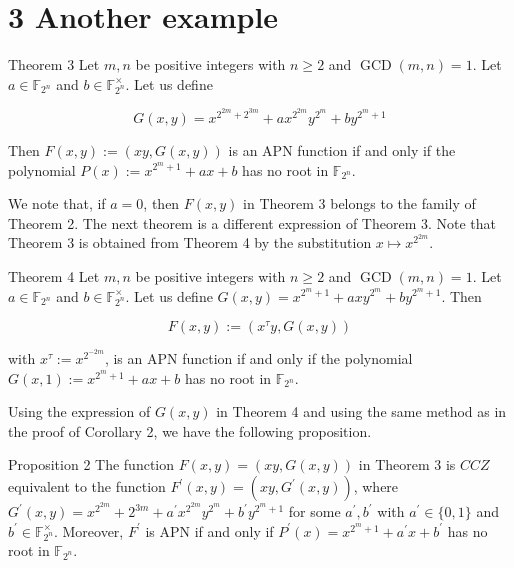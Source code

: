 \documentclass[10pt]{article}
\begin{document}
\section*{3 Another example}
Theorem 3 Let $m, n$ be positive integers with $n \geq 2$ and $\operatorname{GCD}(m, n)=1$. Let $a \in \mathbb{F}_{2^{n}}$ and $b \in \mathbb{F}_{2^{n}}^{\times}$. Let us define


\begin{equation*}
G(x, y)=x^{2^{2 m}+2^{3 m}}+a x^{2^{2 m}} y^{2^{m}}+b y^{2^{m}+1} \tag{2}
\end{equation*}


Then $F(x, y):=(x y, G(x, y))$ is an APN function if and only if the polynomial $P(x):= x^{2^{m}+1}+a x+b$ has no root in $\mathbb{F}_{2^{n}}$.

We note that, if $a=0$, then $F(x, y)$ in Theorem 3 belongs to the family of Theorem 2. The next theorem is a different expression of Theorem 3. Note that Theorem 3 is obtained from Theorem 4 by the substitution $x \mapsto x^{2^{2 m}}$.

Theorem 4 Let $m, n$ be positive integers with $n \geq 2$ and $\operatorname{GCD}(m, n)=1$. Let $a \in \mathbb{F}_{2^{n}}$ and $b \in \mathbb{F}_{2^{n}}^{\times}$. Let us define $G(x, y)=x^{2^{m}+1}+a x y^{2^{m}}+b y^{2^{m}+1}$. Then

$$
F(x, y):=\left(x^{\tau} y, G(x, y)\right)
$$

with $x^{\tau}:=x^{2^{-2 m}}$, is an APN function if and only if the polynomial $G(x, 1):=x^{2^{m}+1}+a x+b$ has no root in $\mathbb{F}_{2^{n}}$.

Using the expression of $G(x, y)$ in Theorem 4 and using the same method as in the proof of Corollary 2, we have the following proposition.

Proposition 2 The function $F(x, y)=(x y, G(x, y))$ in Theorem 3 is $C C Z$ equivalent to the function $F^{\prime}(x, y)=\left(x y, G^{\prime}(x, y)\right)$, where $G^{\prime}(x, y)=x^{2^{2 m}}+2^{3 m}+a^{\prime} x^{2^{2 m}} y^{2^{m}}+b^{\prime} y^{2^{m}+1}$ for some $a^{\prime}, b^{\prime}$ with $a^{\prime} \in\{0,1\}$ and $b^{\prime} \in \mathbb{F}_{2^{n}}^{\times}$. Moreover, $F^{\prime}$ is APN if and only if $P^{\prime}(x)= x^{2^{m}+1}+a^{\prime} x+b^{\prime}$ has no root in $\mathbb{F}_{2^{n}}$.
\end{document}
